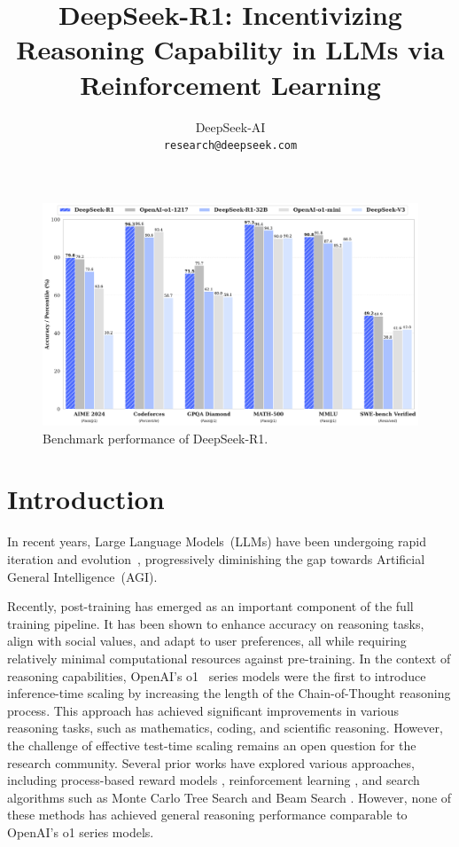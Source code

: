 \documentclass[11pt, a4paper, logo, copyright, nonumbering]{deepseek}
\title{\centering DeepSeek-R1: Incentivizing Reasoning Capability in LLMs via Reinforcement Learning}
\author[*]{
DeepSeek-AI
\\
\small
\texttt{research@deepseek.com}
}
\newcommand{\dsri}{DeepSeek-R1}
\begin{document}
\maketitle
\begin{figure}[h]
\centering
\includegraphics[width=1.0\textwidth]{figures/dsr1_performance.pdf}
\caption{
    \centering
    Benchmark performance of \dsri{}.
}
\label{fig:dsv3_performance}
\end{figure}

\newpage

\begin{spacing}{0.9}
\tableofcontents
\end{spacing}

\newpage

\section{Introduction}
In recent years, Large Language Models~(LLMs) have been undergoing rapid iteration and evolution~\citep{gpt4o,claude35sonnet,gemini1_5}, progressively diminishing the gap towards Artificial General Intelligence~(AGI).

Recently, post-training has emerged as an important component of the full training pipeline. It has been shown to enhance accuracy on reasoning tasks, align with social values, and adapt to user preferences, all while requiring relatively minimal computational resources against pre-training. In the context of reasoning capabilities, OpenAI's o1~\citep{o1} series models were the first to introduce inference-time scaling by increasing the length of the Chain-of-Thought reasoning process. This approach has achieved significant improvements in various reasoning tasks, such as mathematics, coding, and scientific reasoning. However, the challenge of effective test-time scaling remains an open question for the research community. 
Several prior works have explored various approaches, including process-based reward models \citep{uesato2022solving, lightman2023let,mathshepherd}, reinforcement learning \citep{kumar2024training}, and search algorithms such as Monte Carlo Tree Search and Beam Search \citep{feng2024alphazeroliketreesearchguidelarge,xin2024deepseekproverv15harnessingproofassistant,AlphaGeometryTrinh2024}.
However, none of these methods has achieved general reasoning performance comparable to OpenAI's o1 series models.
\end{document}
